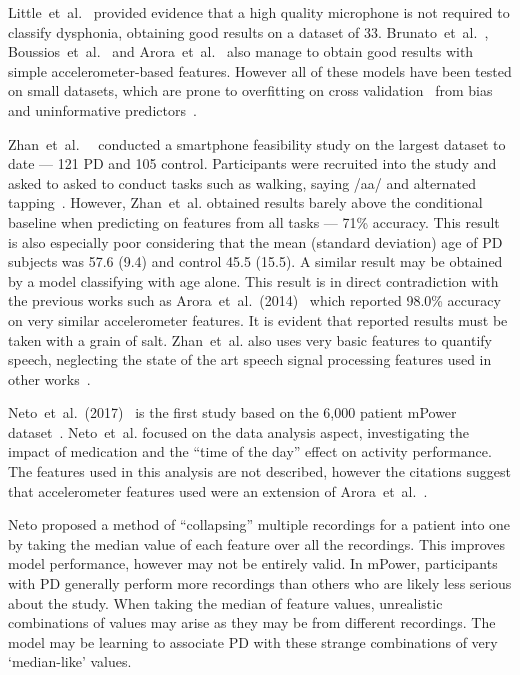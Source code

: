 \documentclass[12pt, twoside]{book}
\begin{document}
Little~et~al.~\cite{splittledysphonia2009} provided evidence that a high quality microphone is not required to classify dysphonia, obtaining good results on a dataset of 33. Brunato~et~al.~\cite{smartphonemjfoxlion}, Boussios~et~al.~\cite{smartphonemjfoxB} and Arora~et~al.~\cite{arora2014high} also manage to obtain good results with simple accelerometer-based features. However all of these models have been tested on small datasets, which are prone to overfitting on cross validation~\cite{overfittingcv} from bias and uninformative predictors~\cite{freedmanparadox}. 


Zhan~et~al.~~\cite{zhan2016high} conducted a smartphone feasibility study on the largest dataset to date --- 121 PD and 105 control. Participants were recruited into the study and asked to asked to conduct tasks such as walking, saying /aa/ and alternated tapping~\cite{tapping}. However, Zhan~et~al. obtained results barely above the conditional baseline when predicting on features from all tasks --- 71\% accuracy. This result is also especially poor considering that the mean (standard deviation) age of PD subjects was 57.6 (9.4) and control 45.5 (15.5). A similar result may be obtained by a model classifying with age alone. This result is in direct contradiction with the previous works such as Arora~et~al.~(2014)~\cite{arora2014high} which reported 98.0\% accuracy on very similar accelerometer features. It is evident that reported results must be taken with a grain of salt. Zhan~et~al. also uses very basic features to quantify speech, neglecting the state of the art speech signal processing features used in other works~\cite{ostextbook, spoverview}. 


Neto~et~al.~(2017)~\cite{mpowerneto2017analysis} is the first study based on the 6,000 patient mPower dataset~\cite{mpower}. Neto~et~al. focused on the data analysis aspect, investigating the impact of medication and the ``time of the day'' effect on activity performance. The features used in this analysis are not described, however the citations suggest that accelerometer features used were an extension of Arora~et~al.~\cite{arora2014high}. 

Neto proposed a method of ``collapsing'' multiple recordings for a patient into one by taking the median value of each feature over all the recordings. This improves model performance, however may not be entirely valid. In mPower, participants with PD generally perform more recordings than others who are likely less serious about the study. When taking the median of feature values, unrealistic combinations of values may arise as they may be from different recordings. The model may be learning to associate PD with these strange combinations of very `median-like' values.
\end{document}
